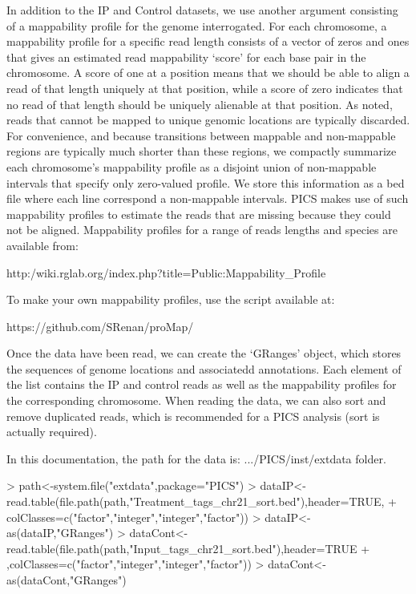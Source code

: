 \documentclass[a4paper]{article}
\begin{document}
In addition to the IP and Control datasets, we use another argument consisting of a mappability profile for the genome interrogated. For each chromosome, a mappability profile for a specific read length consists of a vector of zeros and ones that gives an estimated read mappability `score' for each base pair in the chromosome. A score of one at a position means that we should be able to align a read of that length uniquely at that position, while a score of zero indicates that no read of that length should be uniquely alienable at that position. As noted, reads that cannot be mapped to unique genomic locations are typically discarded. For convenience, and because transitions between mappable and non-mappable regions are typically much shorter than these regions, we compactly summarize each chromosome's mappability profile as a disjoint union of non-mappable intervals that specify only zero-valued profile. We store this information as a bed file where each line correspond a non-mappable intervals. PICS makes use of such mappability profiles to estimate the reads that are missing because they could not be aligned. Mappability profiles for a range of reads lengths and species are available from:

http:/wiki.rglab.org/index.php?title=Public:Mappability_Profile

To make your own mappability profiles, use the script available at:

https://github.com/SRenan/proMap/

Once the data have been read, we can create the `GRanges' object, which stores the sequences of genome locations and associatedd annotations. Each element of the list contains the IP and control reads as well as the mappability profiles for the corresponding chromosome. When reading the data, we can also sort and remove duplicated reads, which is recommended for a PICS analysis (sort is actually required).


In this documentation, the path for the data is:  .../PICS/inst/extdata folder.
\begin{Schunk}
\begin{Sinput}
> path<-system.file("extdata",package="PICS")
> dataIP<-read.table(file.path(path,"Treatment_tags_chr21_sort.bed"),header=TRUE,
+ colClasses=c("factor","integer","integer","factor"))
> dataIP<-as(dataIP,"GRanges")
> dataCont<-read.table(file.path(path,"Input_tags_chr21_sort.bed"),header=TRUE
+ ,colClasses=c("factor","integer","integer","factor"))
> dataCont<-as(dataCont,"GRanges")
\end{Sinput}
\end{Schunk}
\end{document}
